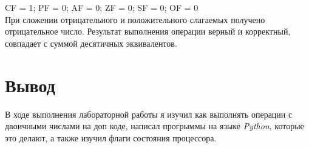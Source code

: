 \documentclass[11pt]{article}
\begin{document}
CF = 1; PF = 0; AF = 0; ZF = 0; SF = 0; OF = 0\\
При сложении отрицательного и положительного слагаемых получено отрицательное число. Результат выполнения операции верный и корректный, совпадает с суммой десятичных эквивалентов.

\section{Вывод}
\label{sec:orgb12dfe2}
В ходе выполнения лабораторной работы я изучил как выполнять операции с двоичными числами на доп коде, написал прогрыммы на языке \emph{Python}, которые это делают, а также изучил флаги состояния процессора.
\end{document}
